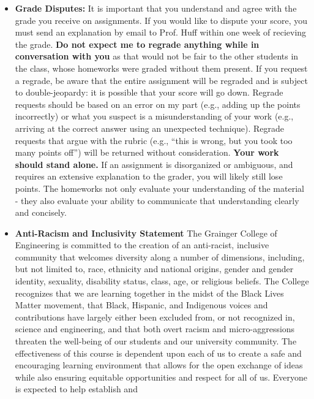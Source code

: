 \documentclass[11pt, a4paper]{article}
\begin{document}
\begin{itemize}
\item[]\textbf{Grade Disputes:} It is important that you understand and agree
        with the grade you receive on assignments. If you would like
        to dispute your score, you must send an explanation by email to Prof.
        Huff within one week of recieving the grade.
        \textbf{Do not expect me to regrade anything while in conversation with
        you} as that would not be fair to the other students in the class, whose
        homeworks were graded without them present.  If you request a regrade,
        be aware that the entire assignment will be regraded and is subject to
        double-jeopardy: it is possible that your score will go down.
        Regrade requests should be based on an error on my part (e.g., adding
        up the points incorrectly) or what you suspect is a misunderstanding of
        your work (e.g., arriving at the correct answer using an unexpected
        technique). Regrade requests that argue with the rubric (e.g., ``this is
        wrong, but you took too many points off'') will be returned without
        consideration.
        \textbf{Your work should stand alone.} If an assignment is disorganized or
        ambiguous, and requires an extensive explanation to the grader, you
        will likely still lose points. The homeworks not only evaluate your
        understanding of the material - they also evaluate your ability to
        communicate that understanding clearly and concisely.
\item[]\textbf{Anti-Racism and Inclusivity Statement} The Grainger College of
        Engineering is committed to the creation of an anti-racist, inclusive
        community that welcomes diversity along a number of dimensions,
        including, but not limited to, race, ethnicity and national origins,
        gender and gender identity, sexuality, disability status, class, age,
        or religious beliefs. The College recognizes that we are learning
        together in the midst of the Black Lives Matter movement, that Black,
        Hispanic, and Indigenous voices and contributions have largely either
        been excluded from, or not recognized in, science and engineering, and
        that both overt racism and micro-aggressions threaten the well-being of
        our students and our university community.
        The effectiveness of this course is dependent upon each of us to create
        a safe and encouraging learning environment that allows for the open
        exchange of ideas while also ensuring equitable opportunities and
        respect for all of us. Everyone is expected to help establish and

\end{itemize}
\end{document}
